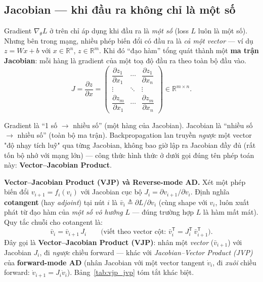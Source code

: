 \documentclass[12pt,a4paper]{report}
\newcommand{\en}[1]{\textit{#1}}
\newcommand{\T}{^{\mathsf{T}}}
\begin{document}
\subsection{Jacobian --- khi đầu ra không chỉ là một số}
\label{sec:jacobian}

Gradient $\nabla_\theta L$ ở trên chỉ áp dụng khi đầu ra là \emph{một số}
(loss $L$ luôn là một số). Nhưng bên trong mạng, nhiều phép biến đổi có
đầu ra là \emph{cả một vector} --- ví dụ $z=Wx+b$ với $x\in\mathbb R^n$,
$z\in\mathbb R^m$. Khi đó ``đạo hàm'' tổng quát thành một \textbf{ma trận
Jacobian}: mỗi hàng là gradient của một toạ độ đầu ra theo toàn bộ đầu vào.
$$J = \frac{\partial z}{\partial x} = \begin{pmatrix}
\dfrac{\partial z_1}{\partial x_1} & \cdots & \dfrac{\partial z_1}{\partial x_n} \\[4pt]
\vdots & \ddots & \vdots \\[2pt]
\dfrac{\partial z_m}{\partial x_1} & \cdots & \dfrac{\partial z_m}{\partial x_n}
\end{pmatrix} \in \mathbb R^{m\times n}.$$

\par\noindent 
Gradient là ``1 số $\to$ nhiều số'' (một hàng của Jacobian). Jacobian là
``nhiều số $\to$ nhiều số'' (toàn bộ ma trận). Backpropagation lan truyền
\emph{ngược} một vector "độ nhạy tích luỹ" qua từng Jacobian, không bao giờ
lập ra Jacobian đầy đủ (rất tốn bộ nhớ với mạng lớn) --- công thức hình
thức ở dưới gọi đúng tên phép toán này: \textbf{Vector--Jacobian Product}.
\par

\textbf{Vector--Jacobian Product (VJP) và Reverse-mode AD.} Xét một phép
biến đổi $v_{i+1}=f_i(v_i)$ với Jacobian cục bộ $J_i=\partial v_{i+1}/\partial v_i$.
Định nghĩa \textbf{cotangent} (hay \emph{adjoint}) tại nút $i$ là
$\bar v_i \triangleq \partial L/\partial v_i$ (cùng shape với $v_i$, luôn
xuất phát từ đạo hàm của \emph{một số vô hướng} $L$ --- đúng trường hợp
$L$ là hàm mất mát). Quy tắc chuỗi cho cotangent là:
$$\bar v_i = \bar v_{i+1}\,J_i \qquad \Big(\text{viết theo vector cột: } \bar v_i\T = J_i\T\,\bar v_{i+1}\T\Big).$$
Đây gọi là \textbf{Vector--Jacobian Product (VJP)}: nhân một \emph{vector}
($\bar v_{i+1}$) với Jacobian $J_i$, đi \emph{ngược} chiều forward --- khác
với \en{Jacobian--Vector Product (JVP)} của \textbf{forward-mode AD} (nhân
Jacobian với một vector tangent $\dot v_i$, đi \emph{xuôi} chiều forward:
$\dot v_{i+1}=J_i\dot v_i$). Bảng~\ref{tab:vjp_jvp} tóm tắt khác biệt.
\end{document}
